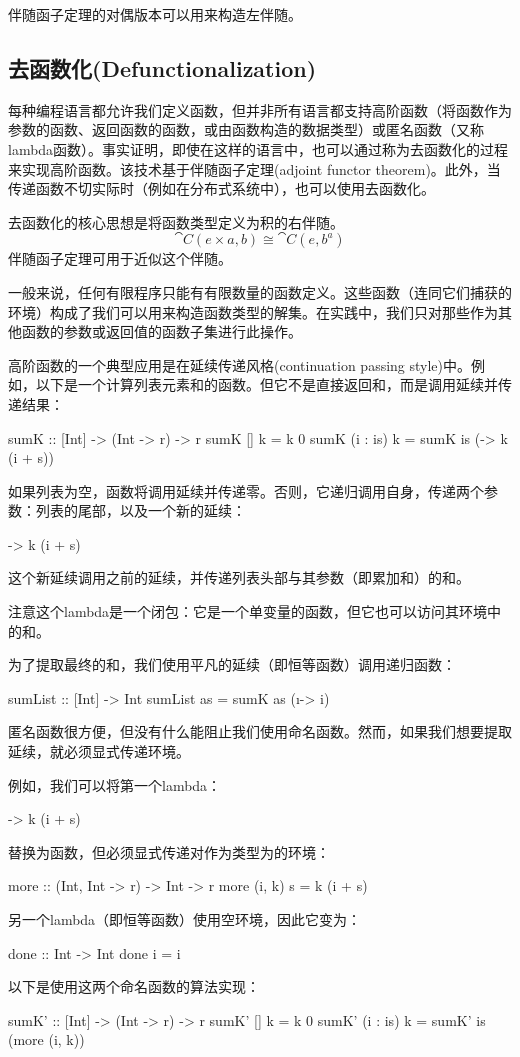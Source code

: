 \documentclass[DaoFP]{subfiles}
\begin{document}
伴随函子定理的对偶版本可以用来构造左伴随。

\subsection{去函数化(Defunctionalization)}

每种编程语言都允许我们定义函数，但并非所有语言都支持高阶函数（将函数作为参数的函数、返回函数的函数，或由函数构造的数据类型）或匿名函数（又称lambda函数）。事实证明，即使在这样的语言中，也可以通过称为去函数化的过程来实现高阶函数。该技术基于伴随函子定理(adjoint functor theorem)。此外，当传递函数不切实际时（例如在分布式系统中），也可以使用去函数化。

去函数化的核心思想是将函数类型定义为积的右伴随。
\[ \cat C(e \times a, b) \cong \cat C(e, b^a) \]
伴随函子定理可用于近似这个伴随。

一般来说，任何有限程序只能有有限数量的函数定义。这些函数（连同它们捕获的环境）构成了我们可以用来构造函数类型的解集。在实践中，我们只对那些作为其他函数的参数或返回值的函数子集进行此操作。

高阶函数的一个典型应用是在延续传递风格(continuation passing style)中。例如，以下是一个计算列表元素和的函数。但它不是直接返回和，而是调用延续并传递结果：
\begin{haskell}
sumK :: [Int] -> (Int -> r) -> r
sumK [] k = k 0
sumK (i : is) k =
  sumK is (\s -> k (i + s))
\end{haskell}
如果列表为空，函数将调用延续并传递零。否则，它递归调用自身，传递两个参数：列表的尾部，以及一个新的延续：
\begin{haskell}
\s -> k (i + s)
\end{haskell}
这个新延续调用之前的延续，并传递列表头部与其参数（即累加和）的和。

注意这个lambda是一个闭包：它是一个单变量的函数，但它也可以访问其环境中的和。

为了提取最终的和，我们使用平凡的延续（即恒等函数）调用递归函数：
\begin{haskell}
sumList :: [Int] -> Int
sumList as = sumK as (\i -> i)
\end{haskell}

匿名函数很方便，但没有什么能阻止我们使用命名函数。然而，如果我们想要提取延续，就必须显式传递环境。

例如，我们可以将第一个lambda：
\begin{haskell}
\s -> k (i + s)
\end{haskell}
替换为函数，但必须显式传递对作为类型为的环境：
\begin{haskell}
more :: (Int, Int -> r) -> Int -> r
more (i, k) s = k (i + s)
\end{haskell}
另一个lambda（即恒等函数）使用空环境，因此它变为：
\begin{haskell}
done :: Int -> Int
done i = i
\end{haskell}
以下是使用这两个命名函数的算法实现：
\begin{haskell}
sumK' :: [Int] -> (Int -> r) -> r
sumK' [] k = k 0
sumK' (i : is) k =
  sumK' is (more (i, k))
\end{haskell}
\end{document}
